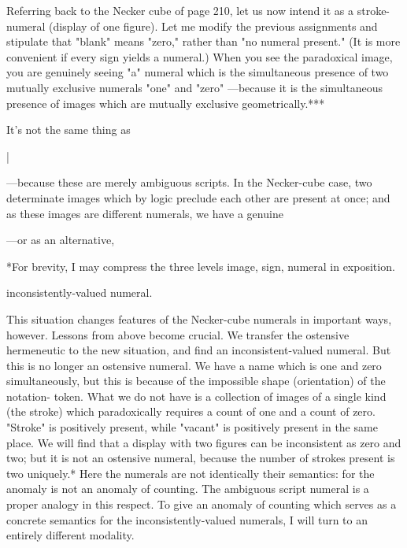 Referring back to the Necker cube of page 210, let us now intend it 
as a stroke-numeral (display of one figure). Let me modify the previous 
assignments and stipulate that "blank" means "zero," rather than "no 
numeral present." (It is more convenient if every sign yields a numeral.) 
When you see the paradoxical image, you are genuinely seeing "a" 
numeral which is the simultaneous presence of two mutually exclusive 
numerals "one" and "zero" ---because it is the simultaneous presence of 
images which are mutually exclusive geometrically.*** 

It's not the same thing as 


| 


---because these are merely ambiguous scripts. In the Necker-cube case, 
two determinate images which by logic preclude each other are present 
at once; and as these images are different numerals, we have a genuine 


---or as an alternative, 


*For brevity, I may compress the three levels image, sign, numeral in 
exposition. 


inconsistently-valued numeral. 

This situation changes features of the Necker-cube numerals in 
important ways, however. Lessons from above become crucial. We 
transfer the ostensive hermeneutic to the new situation, and find an 
inconsistent-valued numeral. But this is no longer an ostensive 
numeral. We have a name which is one and zero simultaneously, but 
this is because of the impossible shape (orientation) of the notation- 
token. What we do not have is a collection of images of a single kind 
(the stroke) which paradoxically requires a count of one and a count of 
zero. "Stroke" is positively present, while "vacant" is positively present 
in the same place. We will find that a display with two figures can be 
inconsistent as zero and two; but it is not an ostensive numeral, because 
the number of strokes present is two uniquely.* Here the numerals are 
not identically their semantics: for the anomaly is not an anomaly of 
counting. The ambiguous script numeral is a proper analogy in this 
respect. To give an anomaly of counting which serves as a concrete 
semantics for the inconsistently-valued numerals, I will turn to an 
entirely different modality. 

